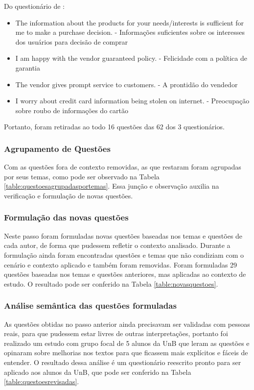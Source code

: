 	Do questionário de \cite{zhang2005}:
	\begin{itemize}
		\item {The information about the products for your needs/interests is sufficient  for me to make a purchase decision.	-	Informações suficientes sobre os interesses dos usuários para decisão de comprar} 
		\item {I am happy with the vendor guaranteed policy.	-	Felicidade com a política de garantia}
		\item {The vendor gives prompt service to customers.	-	A prontidão do vendedor }
		\item {I worry about credit card information being stolen on internet.	-	Preocupação sobre roubo de informações do cartão}
	\end{itemize}

	Portanto, foram retiradas ao todo 16 questões das 62 dos 3 questionários.

	\subsubsection{Agrupamento de Questões}

	Com as questões fora de contexto removidas, as que restaram foram agrupadas por seus temas, como pode ser observado na Tabela \ref{table:questoesagrupadasportemas}. Essa junção e observação auxilia na verificação e formulação de novas questões.

	\subsubsection{Formulação das novas questões}

	Neste passo foram formuladas novas questões baseadas nos temas e questões de cada autor, de forma que pudessem refletir o contexto analisado. Durante a formulação ainda foram encontradas questões e temas que não condiziam com o cenário e contexto aplicado e também foram removidas. Foram formuladas 29 questões baseadas nos temas e questões anteriores, mas aplicadas ao contexto de estudo. O resultado pode ser conferido na Tabela \ref{table:novasquestoes}.

	\subsubsection{Análise semântica das questões formuladas}

	As questões obtidas no passo anterior ainda precisavam ser validadas com pessoas reais, para que pudessem estar livres de outras interpretações, portanto foi realizado um estudo com grupo focal de 5 alunos da UnB que leram as questões e opinaram sobre melhorias nos textos para que ficassem mais explícitos e fáceis de entender. O resultado dessa análise é um questionário reescrito pronto para ser aplicado aos alunos da UnB, que pode ser conferido na Tabela \ref{table:questoesrevisadas}.

